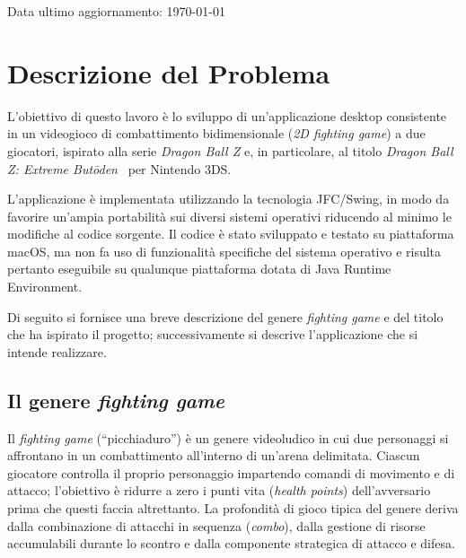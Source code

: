 \documentclass[12pt,a4paper]{report}
\begin{document}
\begin{titlepage}

	\vfill
	\raggedright
	\small{Data ultimo aggiornamento: \today}
\end{titlepage}
\restoregeometry

\tableofcontents

\chapter{Descrizione del Problema}\label{ch:despro}
L'obiettivo di questo lavoro è lo sviluppo di un'applicazione desktop consistente in un videogioco di combattimento bidimensionale (\emph{2D fighting game}) a due giocatori, ispirato alla serie \emph{Dragon Ball Z} e, in particolare, al titolo \emph{Dragon Ball Z: Extreme Butōden}~\cite{extremebutoden} per Nintendo 3DS.

L'applicazione è implementata utilizzando la tecnologia JFC/Swing, in modo da favorire un'ampia portabilità sui diversi sistemi operativi riducendo al minimo le modifiche al codice sorgente. Il codice è stato sviluppato e testato su piattaforma macOS, ma non fa uso di funzionalità specifiche del sistema operativo e risulta pertanto eseguibile su qualunque piattaforma dotata di Java Runtime Environment.

\medskip
Di seguito si fornisce una breve descrizione del genere \emph{fighting game} e del titolo che ha ispirato il progetto; successivamente si descrive l'applicazione che si intende realizzare.

\section{Il genere \emph{fighting game}}\label{se:fighting}
Il \emph{fighting game} (``picchiaduro'') è un genere videoludico in cui due personaggi si affrontano in un combattimento all'interno di un'arena delimitata. Ciascun giocatore controlla il proprio personaggio impartendo comandi di movimento e di attacco; l'obiettivo è ridurre a zero i punti vita (\emph{health points}) dell'avversario prima che questi faccia altrettanto. La profondità di gioco tipica del genere deriva dalla combinazione di attacchi in sequenza (\emph{combo}), dalla gestione di risorse accumulabili durante lo scontro e dalla componente strategica di attacco e difesa.
\end{document}
